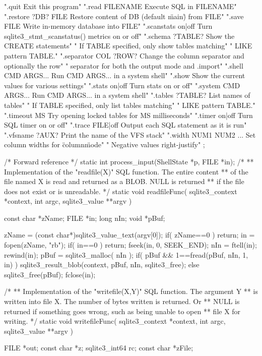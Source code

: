 \begin{Codex}[label=shell.c,numbers=left]
{  ".quit                  Exit this program\n"
  ".read FILENAME         Execute SQL in FILENAME\n"
  ".restore ?DB? FILE     Restore content of DB (default \"main\") from FILE\n"
  ".save FILE             Write in-memory database into FILE\n"
  ".scanstats on|off      Turn sqlite3_stmt_scanstatus() metrics on or off\n"
  ".schema ?TABLE?        Show the CREATE statements\n"
  "                         If TABLE specified, only show tables matching\n"
  "                         LIKE pattern TABLE.\n"
  ".separator COL ?ROW?   Change the column separator and optionally the row\n"
  "                         separator for both the output mode and .import\n"
  ".shell CMD ARGS...     Run CMD ARGS... in a system shell\n"
  ".show                  Show the current values for various settings\n"
  ".stats on|off          Turn stats on or off\n"
  ".system CMD ARGS...    Run CMD ARGS... in a system shell\n"
  ".tables ?TABLE?        List names of tables\n"
  "                         If TABLE specified, only list tables matching\n"
  "                         LIKE pattern TABLE.\n"
  ".timeout MS            Try opening locked tables for MS milliseconds\n"
  ".timer on|off          Turn SQL timer on or off\n"
  ".trace FILE|off        Output each SQL statement as it is run\n"
  ".vfsname ?AUX?         Print the name of the VFS stack\n"
  ".width NUM1 NUM2 ...   Set column widths for \"column\" mode\n"
  "                         Negative values right-justify\n"
;

/* Forward reference */
static int process_input(ShellState *p, FILE *in);
/*
** Implementation of the "readfile(X)" SQL function.  The entire content
** of the file named X is read and returned as a BLOB.  NULL is returned
** if the file does not exist or is unreadable.
*/
static void readfileFunc(
  sqlite3_context *context,
  int argc,
  sqlite3_value **argv
){
  const char *zName;
  FILE *in;
  long nIn;
  void *pBuf;

  zName = (const char*)sqlite3_value_text(argv[0]);
  if( zName==0 ) return;
  in = fopen(zName, "rb");
  if( in==0 ) return;
  fseek(in, 0, SEEK_END);
  nIn = ftell(in);
  rewind(in);
  pBuf = sqlite3_malloc( nIn );
  if( pBuf && 1==fread(pBuf, nIn, 1, in) ){
    sqlite3_result_blob(context, pBuf, nIn, sqlite3_free);
  }else{
    sqlite3_free(pBuf);
  }
  fclose(in);
}

/*
** Implementation of the "writefile(X,Y)" SQL function.  The argument Y
** is written into file X.  The number of bytes written is returned.  Or
** NULL is returned if something goes wrong, such as being unable to open
** file X for writing.
*/
static void writefileFunc(
  sqlite3_context *context,
  int argc,
  sqlite3_value **argv
){
  FILE *out;
  const char *z;
  sqlite3_int64 rc;
  const char *zFile;

}}
\end{Codex}
